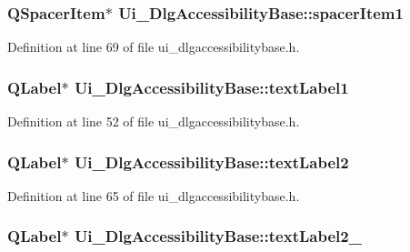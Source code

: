 \hypertarget{classUi__DlgAccessibilityBase_a2fa40aa9319045894111f40c872dd4d5}{
\subsubsection[{spacer\+Item1}]{\setlength{\rightskip}{0pt plus 5cm}Q\+Spacer\+Item$\ast$ Ui\+\_\+\+Dlg\+Accessibility\+Base\+::spacer\+Item1}}\label{classUi__DlgAccessibilityBase_a2fa40aa9319045894111f40c872dd4d5}


Definition at line 69 of file ui\+\_\+dlgaccessibilitybase.\+h.

\hypertarget{classUi__DlgAccessibilityBase_a8487704a7e035affc3a6ef7f80572d21}{
\subsubsection[{text\+Label1}]{\setlength{\rightskip}{0pt plus 5cm}Q\+Label$\ast$ Ui\+\_\+\+Dlg\+Accessibility\+Base\+::text\+Label1}}\label{classUi__DlgAccessibilityBase_a8487704a7e035affc3a6ef7f80572d21}


Definition at line 52 of file ui\+\_\+dlgaccessibilitybase.\+h.

\hypertarget{classUi__DlgAccessibilityBase_a86309f7fdcc0194a41f39ae3bc98fa6e}{
\subsubsection[{text\+Label2}]{\setlength{\rightskip}{0pt plus 5cm}Q\+Label$\ast$ Ui\+\_\+\+Dlg\+Accessibility\+Base\+::text\+Label2}}\label{classUi__DlgAccessibilityBase_a86309f7fdcc0194a41f39ae3bc98fa6e}


Definition at line 65 of file ui\+\_\+dlgaccessibilitybase.\+h.

\hypertarget{classUi__DlgAccessibilityBase_a2994502da41dffae4e1691734c4c352b}{
\subsubsection[{text\+Label2\+\_\+2}]{\setlength{\rightskip}{0pt plus 5cm}Q\+Label$\ast$ Ui\+\_\+\+Dlg\+Accessibility\+Base\+::text\+Label2\+\_}}\label{classUi__DlgAccessibilityBase_a2994502da41dffae4e1691734c4c352b}


